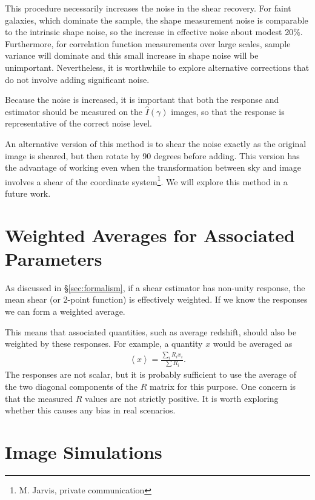 \documentclass[iop]{emulateapj}
\begin{document}
This procedure necessarily increases the noise in the shear recovery.  For
faint galaxies, which dominate the sample, the shape measurement noise is
comparable to the intrinsic shape noise, so the increase in effective noise
about modest 20\%.  Furthermore, for correlation function measurements over
large scales, sample variance will dominate and this small increase in shape
noise will be unimportant.  Nevertheless, it is worthwhile to explore
alternative corrections that do not involve adding significant noise.

Because the noise is increased, it is important that both the response and
estimator should be measured on the $\hat{I}(\gamma)$ images, so that the
response is representative of the correct noise level.

An alternative version of this method is to shear the noise exactly as the
original image is sheared, but then rotate by 90 degrees before adding.  This
version has the advantage of working even when the transformation between sky
and image involves a shear of the coordinate system\footnote{M. Jarvis, private
communication}. We will explore this method in a future work.

\section{Weighted Averages for Associated Parameters} \label{sec:weighting}

As discussed in \S \ref{sec:formalism}, if a shear estimator has
non-unity response, the mean shear (or 2-point function) is effectively
weighted.  If we know the responses we can form a weighted average.

This means that associated quantities, such as average redshift, should also be
weighted by these responses.  For example, a quantity $x$ would be averaged
as
\begin{align}
    \left< x \right> = \frac{\sum_i R_i x_i}{\sum R_i}.
\end{align}
The responses are not scalar, but it is probably sufficient
to use the average of the two diagonal components of the $R$ matrix
for this purpose. One concern is that the measured $R$ values are not
strictly positive.  It is worth exploring whether this causes
any bias in real scenarios.

\section{Image Simulations} \label{sec:sims}
\end{document}
